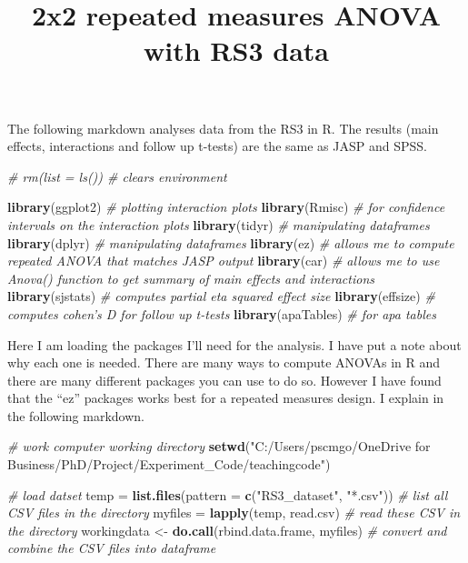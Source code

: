 \documentclass[]{article}
\title{2x2 repeated measures ANOVA with RS3 data}
\author{}
\date{}
\newenvironment{Shaded}{\begin{snugshade}}{\end{snugshade}}
\newcommand{\KeywordTok}[1]{\textcolor[rgb]{0.13,0.29,0.53}{\textbf{#1}}}
\newcommand{\DataTypeTok}[1]{\textcolor[rgb]{0.13,0.29,0.53}{#1}}
\newcommand{\StringTok}[1]{\textcolor[rgb]{0.31,0.60,0.02}{#1}}
\newcommand{\CommentTok}[1]{\textcolor[rgb]{0.56,0.35,0.01}{\textit{#1}}}
\newcommand{\NormalTok}[1]{#1}
\begin{document}
\maketitle

The following markdown analyses data from the RS3 in R. The results
(main effects, interactions and follow up t-tests) are the same as JASP
and SPSS.

\begin{Shaded}
\begin{Highlighting}[]
\CommentTok{# rm(list = ls()) # clears environment}

\KeywordTok{library}\NormalTok{(ggplot2) }\CommentTok{# plotting interaction plots}
\KeywordTok{library}\NormalTok{(Rmisc) }\CommentTok{# for confidence intervals on the interaction plots}
\KeywordTok{library}\NormalTok{(tidyr) }\CommentTok{# manipulating dataframes}
\KeywordTok{library}\NormalTok{(dplyr) }\CommentTok{# manipulating dataframes}
\KeywordTok{library}\NormalTok{(ez) }\CommentTok{# allows me to compute repeated ANOVA that matches JASP output}
\KeywordTok{library}\NormalTok{(car) }\CommentTok{# allows me to use Anova() function to get summary of main effects and interactions}
\KeywordTok{library}\NormalTok{(sjstats) }\CommentTok{# computes partial eta squared effect size}
\KeywordTok{library}\NormalTok{(effsize) }\CommentTok{# computes cohen's D for follow up t-tests}
\KeywordTok{library}\NormalTok{(apaTables) }\CommentTok{# for apa tables}
\end{Highlighting}
\end{Shaded}

Here I am loading the packages I'll need for the analysis. I have put a
note about why each one is needed. There are many ways to compute ANOVAs
in R and there are many different packages you can use to do so. However
I have found that the ``ez'' packages works best for a repeated measures
design. I explain in the following markdown.

\begin{Shaded}
\begin{Highlighting}[]
\CommentTok{# work computer working directory}
\KeywordTok{setwd}\NormalTok{(}\StringTok{"C:/Users/pscmgo/OneDrive for Business/PhD/Project/Experiment_Code/teachingcode"}\NormalTok{)}

\CommentTok{# load datset}
\NormalTok{temp =}\StringTok{ }\KeywordTok{list.files}\NormalTok{(}\DataTypeTok{pattern =} \KeywordTok{c}\NormalTok{(}\StringTok{"RS3_dataset"}\NormalTok{, }\StringTok{"*.csv"}\NormalTok{)) }\CommentTok{# list all CSV files in the directory}
\NormalTok{myfiles =}\StringTok{ }\KeywordTok{lapply}\NormalTok{(temp, read.csv) }\CommentTok{# read these CSV in the directory}
\NormalTok{workingdata <-}\StringTok{ }\KeywordTok{do.call}\NormalTok{(rbind.data.frame, myfiles) }\CommentTok{# convert and combine the CSV files into dataframe}
\end{Highlighting}
\end{Shaded}
\end{document}
